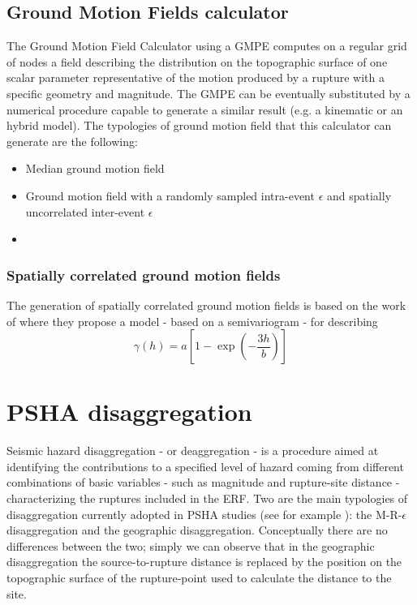 \subsection{Ground Motion Fields calculator}
%
The Ground Motion Field Calculator using a GMPE computes on a regular grid of nodes a field  describing the distribution on the topographic surface of one scalar parameter representative of the motion produced by a rupture with a specific geometry and magnitude.
%
The GMPE can be eventually substituted by a numerical procedure capable to generate a similar result (e.g. a kinematic or an hybrid model). 
%
The typologies of ground motion field that this calculator can generate are the following:
\begin{itemize}
\item Median ground motion field
\item Ground motion field with a randomly sampled intra-event $\epsilon$ and spatially uncorrelated inter-event $\epsilon$
\item
\end{itemize}
%
\subsubsection{Spatially correlated ground motion fields}
The generation of spatially correlated ground motion fields is based on the work of \citet{jayaram2009} where they propose a model - based on a semivariogram - for describing 
\begin{equation}
\gamma(h) = a \left[1-\exp\left(-\frac{3h}{b}\right)\right]
\label{eq:jayaram_spat_corr}
\end{equation}
%
\clearpage\newpage
\section{PSHA disaggregation}
\label{chap:disaggregation}
%
Seismic hazard disaggregation - or deaggregation - \citep{mcguire1995,bazzurro1999} is a procedure aimed at identifying the contributions to a specified level of hazard coming from different combinations
of basic variables - such as magnitude and rupture-site distance - characterizing the ruptures included in the ERF.
%
Two are the main typologies of disaggregation currently adopted in PSHA studies (see for example \citet{petersen2008}): the M-R-$\epsilon$ disaggregation and the geographic disaggregation. Conceptually there are no differences between the two; simply we can observe that in the geographic disaggregation the source-to-rupture distance is replaced by the position on the topographic surface of the rupture-point used to calculate the distance to the site.
%

